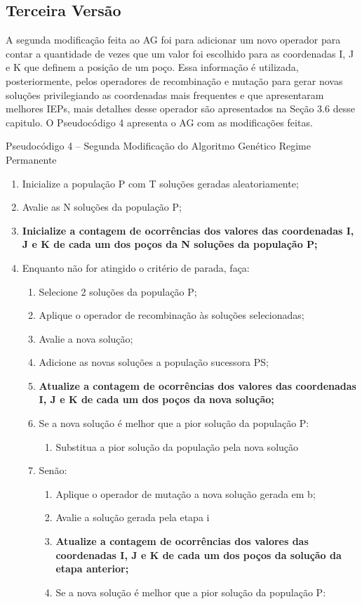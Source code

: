 \subsection{Terceira Versão}

A segunda modificação feita ao AG foi para adicionar um novo operador para contar a quantidade de vezes que um valor foi escolhido para as coordenadas I, J e K que definem a posição de um poço. Essa informação é utilizada, posteriormente, pelos operadores de recombinação e mutação para gerar novas soluções privilegiando as coordenadas mais frequentes e que apresentaram melhores IEPs, mais detalhes desse operador são apresentados na Seção 3.6 desse capitulo. O Pseudocódigo 4 apresenta o AG com as modificações feitas.

Pseudocódigo 4 – Segunda Modificação do Algoritmo Genético Regime Permanente 

\begin{enumerate}
\item Inicialize a população P com T soluções geradas aleatoriamente;
\item Avalie as N soluções da população P;
\item \textbf{ Inicialize a contagem de ocorrências dos valores das coordenadas I, J e K de cada um dos poços da N soluções da população P;}
\item Enquanto não for atingido o critério de parada, faça:

 \begin{enumerate}

\item Selecione 2 soluções da população P;
\item Aplique o operador de recombinação às soluções selecionadas;

\item Avalie a nova solução;
\item Adicione as novas soluções a população sucessora PS;
\item \textbf{Atualize a contagem de ocorrências dos valores das coordenadas I, J e K de cada um dos poços da nova solução;}
\item Se a nova solução é melhor que a pior solução da população P:
  \begin{enumerate}
\item Substitua a pior solução da população pela nova solução

  \end{enumerate}
\item Senão:	
  \begin{enumerate}
\item Aplique o operador de mutação a nova solução gerada em b;
\item Avalie a solução gerada pela etapa i
\item \textbf{Atualize a contagem de ocorrências dos valores das coordenadas I, J e K de cada um dos poços da solução da etapa anterior;}
\item Se a nova solução é melhor que a pior solução da população P:
  \end{enumerate}
 \end{enumerate}
\end{enumerate}

